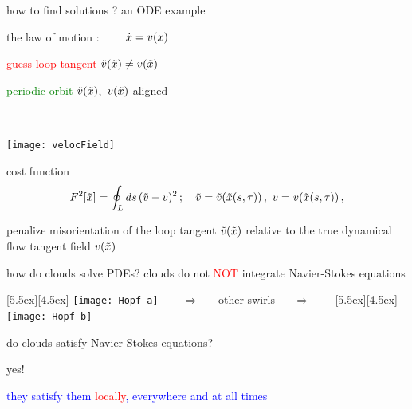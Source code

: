 \begin{frame}{how to find solutions ? an ODE example}
\begin{center}
the law of motion : $\qquad \dot{x} = v(x)$
\begin{minipage}[c]{0.55\textwidth}
\textcolor{red}{guess loop tangent}
$\tilde{v}(\tilde{x})
	\neq
v(\tilde{x})$

	\vskip 0.5cm

\textcolor{green}{periodic orbit}
$\tilde{v}(\tilde{x})$,~$v(\tilde{x})$
aligned
\end{minipage}%
~~~~~~~\begin{minipage}[c]{0.40\textwidth}
	\begin{center}
	\texttt{[image: velocField]}
	\end{center}
\end{minipage}
\end{center}
\begin{block}{cost function}%
\[
F^2[\tilde{x}] =
            \oint_L ds\,(\tilde{v}-v)^2
    \,;\quad
    \tilde{v} = \tilde{v}(\tilde{x}(s,\tau))\,,\,\,
    v = v(\tilde{x}(s,\tau))
\,,
\]
\end{block}
\bigskip

penalize%
 misorientation of the loop tangent
$\tilde{v}(\tilde{x})$
relative to the true dynamical flow tangent field $v(\tilde{x})$
\end{frame}

\begin{frame}{how do clouds solve PDEs?}
clouds do not \textcolor{red}{\Huge NOT} {integrate} Navier-Stokes equations

\bigskip\bigskip

\begin{center}
\begin{minipage}[t]{\textwidth}
	\begin{center}
\centerline{
\raisebox{-4.0ex}[5.5ex][4.5ex]
		 {\texttt{[image: Hopf-a]}}
~~~ $\Longrightarrow$ ~~ {other swirls} ~~ $\Longrightarrow$ ~~~
	\raisebox{-4.0ex}[5.5ex][4.5ex]
		 {\texttt{[image: Hopf-b]}}
          }
	\end{center}
\end{minipage}
\end{center}

do clouds satisfy Navier-Stokes equations?

\bigskip

{\Large yes!}

\centerline{
\textcolor{blue}{they satisfy them \textcolor{red}{\large locally}, everywhere and at all times}
}
\end{frame}

